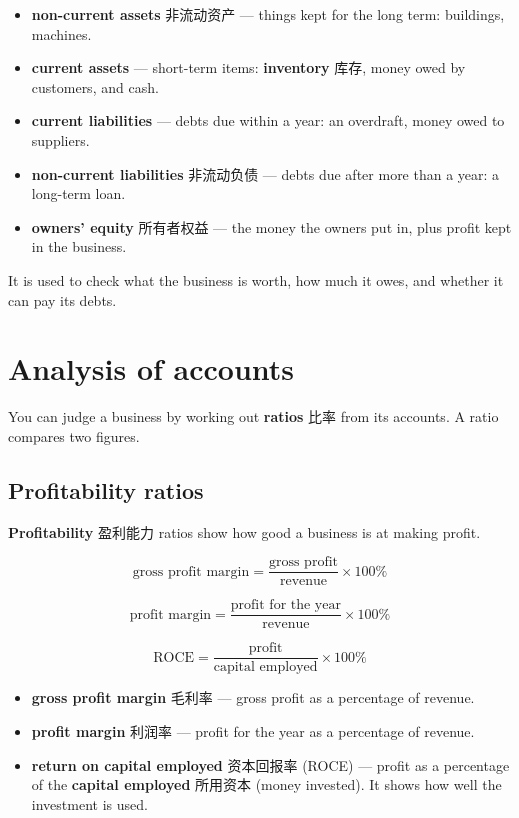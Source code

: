 \documentclass[11pt]{article}
\begin{document}
\begin{itemize}
\item \textbf{non-current assets} 非流动资产 — things kept for the long term: buildings, machines.

\item \textbf{current assets} — short-term items: \textbf{inventory} 库存, money owed by customers, and cash.

\item \textbf{current liabilities} — debts due within a year: an overdraft, money owed to suppliers.

\item \textbf{non-current liabilities} 非流动负债 — debts due after more than a year: a long-term loan.

\item \textbf{owners' equity} 所有者权益 — the money the owners put in, plus profit kept in the business.

\end{itemize}

It is used to check what the business is worth, how much it owes, and whether it can pay its debts.

\section*{Analysis of accounts}

You can judge a business by working out \textbf{ratios} 比率 from its accounts. A ratio compares two figures.

\subsection*{Profitability ratios}

\textbf{Profitability} 盈利能力 ratios show how good a business is at making profit.

\[
\text{gross profit margin} = \frac{\text{gross profit}}{\text{revenue}} \times 100\%
\]

\[
\text{profit margin} = \frac{\text{profit for the year}}{\text{revenue}} \times 100\%
\]

\[
\text{ROCE} = \frac{\text{profit}}{\text{capital employed}} \times 100\%
\]

\begin{itemize}
\item \textbf{gross profit margin} 毛利率 — gross profit as a percentage of revenue.

\item \textbf{profit margin} 利润率 — profit for the year as a percentage of revenue.

\item \textbf{return on capital employed} 资本回报率 (ROCE) — profit as a percentage of the \textbf{capital employed} 所用资本 (money invested). It shows how well the investment is used.

\end{itemize}
\end{document}
